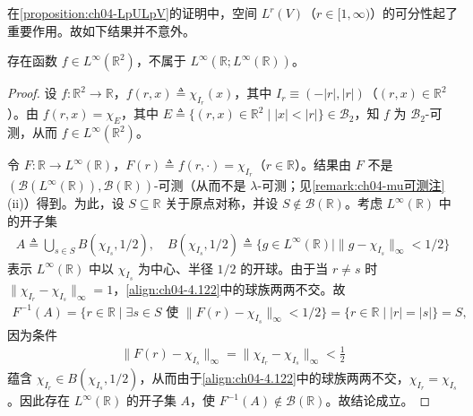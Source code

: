 \documentclass[../../main.tex]{subfiles}%
\begin{document}
在\cref{proposition:ch04-LpULpV}的证明中，空间 $L^r(V)$（$r\in[1,\infty)$）的可分性起了重要作用。故如下结果并不意外。

\begin{proposition}\label{proposition:ch04-L无穷不可交换}
存在函数 $f\in L^\infty(\mathbb{R}^2)$，不属于 $L^\infty(\mathbb{R};L^\infty(\mathbb{R}))$。
\end{proposition}

\begin{proof}
设 $f:\mathbb{R}^2\to\mathbb{R}$，$f(r,x)\triangleq \chi_{I_r}(x)$，其中 $I_r\equiv(-|r|,|r|)$（$(r,x)\in\mathbb{R}^2$）。由 $f(r,x)=\chi_E$，其中 $E\triangleq\{(r,x)\in\mathbb{R}^2\mid |x|<|r|\}\in\mathcal{B}_2$，知 $f$ 为 $\mathcal{B}_2$-可测，从而 $f\in L^\infty(\mathbb{R}^2)$。

令 $F:\mathbb{R}\to L^\infty(\mathbb{R})$，$F(r)\triangleq f(r,\cdot)=\chi_{I_r}$（$r\in\mathbb{R}$）。结果由 $F$ 不是 $(\mathcal{B}(L^\infty(\mathbb{R})),\mathcal{B}(\mathbb{R}))$-可测（从而不是 $\lambda$-可测；见\cref{remark:ch04-mu可测注}(ii)）得到。为此，设 $S\subseteq\mathbb{R}$ 关于原点对称，并设 $S\notin\mathcal{B}(\mathbb{R})$。考虑 $L^\infty(\mathbb{R})$ 中的开子集
\begin{align}
A\triangleq \bigcup_{s\in S}B(\chi_{I_s},1/2),\quad B(\chi_{I_s},1/2)\triangleq \{g\in L^\infty(\mathbb{R})\mid\|g-\chi_{I_s}\|_\infty<1/2\} \label{align:ch04-4.122}
\end{align}
表示 $L^\infty(\mathbb{R})$ 中以 $\chi_{I_s}$ 为中心、半径 $1/2$ 的开球。由于当 $r\neq s$ 时 $\|\chi_{I_r}-\chi_{I_s}\|_\infty=1$，\eqref{align:ch04-4.122}中的球族两两不交。故
\begin{align*}
F^{-1}(A)=\{r\in\mathbb{R}\mid\exists s\in S\text{ 使 }\|F(r)-\chi_{I_s}\|_\infty<1/2\}
=\{r\in\mathbb{R}\mid |r|=|s|\}=S,
\end{align*}
因为条件
\begin{align*}
\|F(r)-\chi_{I_s}\|_\infty=\|\chi_{I_r}-\chi_{I_s}\|_\infty<\frac12
\end{align*}
蕴含 $\chi_{I_r}\in B(\chi_{I_s},1/2)$，从而由于\eqref{align:ch04-4.122}中的球族两两不交，$\chi_{I_r}=\chi_{I_s}$。因此存在 $L^\infty(\mathbb{R})$ 的开子集 $A$，使 $F^{-1}(A)\notin\mathcal{B}(\mathbb{R})$。故结论成立。
\end{proof}
\end{document}
